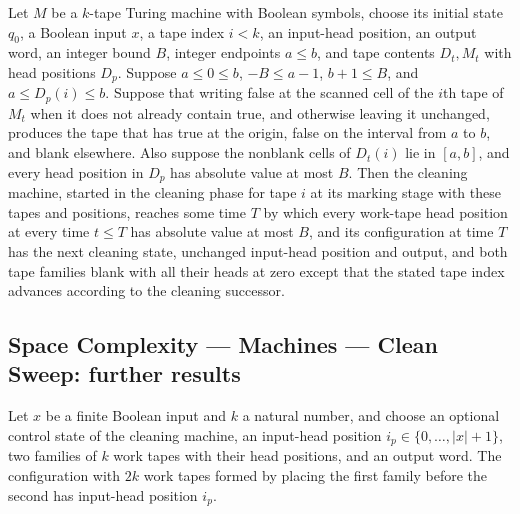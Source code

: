 \begin{lemma}
\label{Complexity.LogProg.clean_tape}
\leanok
{}
Let $M$ be a $k$-tape Turing machine with Boolean symbols, choose its initial state
$q_0$, a Boolean input $x$, a tape index $i<k$, an input-head position, an output word,
an integer bound $B$, integer endpoints $a\le b$, and tape contents $D_t,M_t$ with head
positions $D_p$. Suppose $a\le0\le b$, $-B\le a-1$, $b+1\le B$, and $a\le D_p(i)\le b$.
Suppose that writing false at the scanned cell of the $i$th tape of $M_t$ when it does
not already contain true, and otherwise leaving it unchanged, produces the tape that has
true at the origin, false on the interval from $a$ to $b$, and blank elsewhere. Also
suppose the nonblank cells of $D_t(i)$ lie in $[a,b]$, and every head position in $D_p$
has absolute value at most $B$. Then the cleaning machine, started in the cleaning phase
for tape $i$ at its marking stage with these tapes and positions, reaches some time $T$
by which every work-tape head position at every time $t\le T$ has absolute value at most
$B$, and its configuration at time $T$ has the next cleaning state, unchanged input-head
position and output, and both tape families blank with all their heads at zero except
that the stated tape index advances according to the cleaning successor.
\end{lemma}

\subsection*{Space Complexity --- Machines --- Clean Sweep: further results}

\begin{lemma}
\label{Complexity.LogProg.ccfg_inputPos}
\leanok
{}
Let $x$ be a finite Boolean input and $k$ a natural number, and choose an optional
control state of the cleaning machine, an input-head position $i_p\in\{0,\dots,|x|+1\}$,
two families of $k$ work tapes with their head positions, and an output word. The
configuration with $2k$ work tapes formed by placing the first family before the second
has input-head position $i_p$.
\end{lemma}

